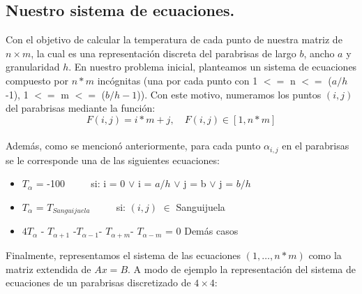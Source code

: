 \subsection{Nuestro sistema de ecuaciones.}

Con el objetivo de calcular la temperatura de cada punto de nuestra matriz de $n\times m$, la cual es una representación discreta del parabrisas de largo $b$, ancho $a$ y granularidad $h$. En nuestro problema inicial, planteamos un sistema de ecuaciones compuesto por $n*m$ incógnitas (una por cada punto con 1 $<=$ n $<=$ ($a/h$ -1), 1 $<=$ m $<=$ ($b/h -1$)). Con este motivo, numeramos los puntos $(i,j)$ del parabrisas mediante la función:\\

\begin{equation}
	F(i, j) = i*m + j, \quad F(i,j) \in [1, n*m]
\end{equation}\\

Además, como se mencionó anteriormente, para cada punto $\alpha_{i,j}$ en el parabrisas se le corresponde una de las siguientes ecuaciones:


  \begin{itemize}
    \item 	$T_{\alpha}$ = -100 $\quad \quad$ si: i = 0 $\vee$ i = $a/h$ $\vee$ j = b $\vee$ j = $b/h$\newline
    \item 	$T_{\alpha}$ = $T_{Sanguijuela}$ $\quad \quad$ si: $(i,j)$ $\in$ Sanguijuela \newline
  	  \item 	$4T_{\alpha}$ - $T_{\alpha+1}$ -$T_{\alpha-1}$- $T_{\alpha+m}$- $T_{\alpha-m}$ = 0 \quad \quad Demás casos\newline
  \end{itemize}

Finalmente, representamos el sistema de las ecuaciones $(1,\ldots, n*m)$ como la matriz extendida de $Ax=B$.
A modo de ejemplo la representación del sistema de ecuaciones de un parabrisas discretizado de $4\times 4$:

\setcounter{MaxMatrixCols}{20}


